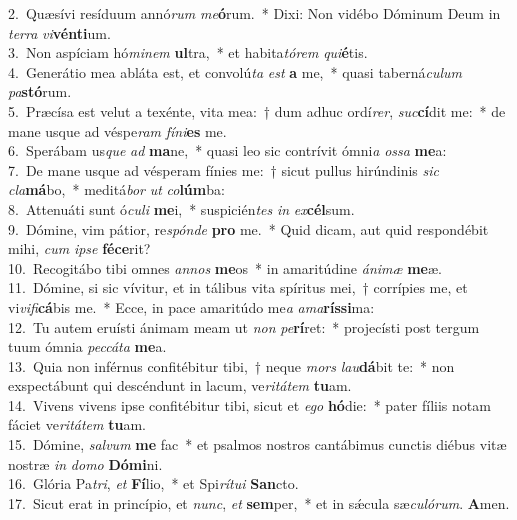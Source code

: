 {2.~}Quæsívi resíduum annó\textit{rum} \textit{me}\textbf{ó}rum.~* Dixi: Non vidébo Dóminum Deum in \textit{ter}\textit{ra} \textit{vi}\textbf{vén}\textbf{ti}um.\\
{3.~}Non aspíciam hó\textit{mi}\textit{nem} \textbf{ul}tra,~* et habita\textit{tó}\textit{rem} \textit{qui}\textbf{é}tis.\\
{4.~}Generátio mea abláta est, et convolú\textit{ta} \textit{est} \textbf{a} me,~* quasi taberná\textit{cu}\textit{lum} \textit{pa}\textbf{stó}rum.\\
{5.~}Præcísa est velut a texénte, vita mea:~† dum adhuc ordí\textit{rer}, \textit{suc}\textbf{cí}dit me:~* de mane usque ad véspe\textit{ram} \textit{fí}\textit{ni}\textbf{es} me.\\
{6.~}Sperábam us\textit{que} \textit{ad} \textbf{ma}ne,~* quasi leo sic contrívit ómni\textit{a} \textit{os}\textit{sa} \textbf{me}a:\\
{7.~}De mane usque ad vésperam fínies me:~† sicut pullus hirúndinis \textit{sic} \textit{cla}\textbf{má}bo,~* meditá\textit{bor} \textit{ut} \textit{co}\textbf{lúm}ba:\\
{8.~}Attenuáti sunt ó\textit{cu}\textit{li} \textbf{me}i,~* suspicién\textit{tes} \textit{in} \textit{ex}\textbf{cél}sum.\\
{9.~}Dómine, vim pátior, re\textit{spón}\textit{de} \textbf{pro} me.~* Quid dicam, aut quid respondébit mihi, \textit{cum} \textit{i}\textit{pse} \textbf{fé}\textbf{ce}rit?\\
{10.~}Recogitábo tibi omnes \textit{an}\textit{nos} \textbf{me}os~* in amaritúdine \textit{á}\textit{ni}\textit{mæ} \textbf{me}æ.\\
{11.~}Dómine, si sic vívitur, et in tálibus vita spíritus mei,~† corrípies me, et vi\textit{vi}\textit{fi}\textbf{cá}bis me.~* Ecce, in pace amaritúdo me\textit{a} \textit{a}\textit{ma}\textbf{rís}\textbf{si}ma:\\
{12.~}Tu autem eruísti ánimam meam ut \textit{non} \textit{pe}\textbf{rí}ret:~* projecísti post tergum tuum ómnia \textit{pec}\textit{cá}\textit{ta} \textbf{me}a.\\
{13.~}Quia non inférnus confitébitur tibi,~† neque \textit{mors} \textit{lau}\textbf{dá}bit te:~* non exspectábunt qui descéndunt in lacum, ve\textit{ri}\textit{tá}\textit{tem} \textbf{tu}am.\\
{14.~}Vivens vivens ipse confitébitur tibi, sicut et \textit{e}\textit{go} \textbf{hó}die:~* pater fíliis notam fáciet ve\textit{ri}\textit{tá}\textit{tem} \textbf{tu}am.\\
{15.~}Dómine, \textit{sal}\textit{vum} \textbf{me} fac~* et psalmos nostros cantábimus cunctis diébus vitæ nostræ \textit{in} \textit{do}\textit{mo} \textbf{Dó}\textbf{mi}ni.\\
{16.~}Glória Pa\textit{tri}, \textit{et} \textbf{Fí}lio,~* et Spi\textit{rí}\textit{tu}\textit{i} \textbf{San}cto.\\
{17.~}Sicut erat in princípio, et \textit{nunc}, \textit{et} \textbf{sem}per,~* et in sǽcula sæ\textit{cu}\textit{ló}\textit{rum}. \textbf{A}men.\\
